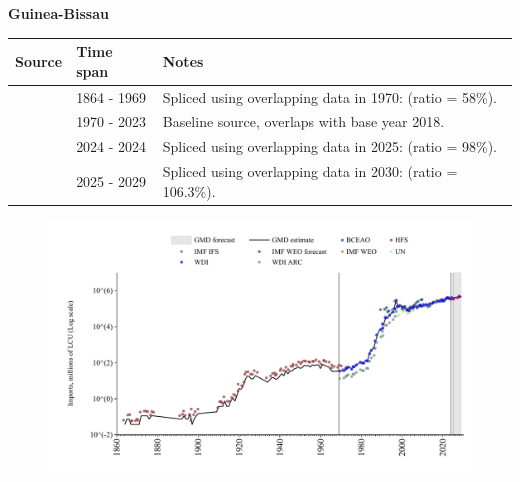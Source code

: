 \documentclass[12pt,a4paper,landscape]{article}
\begin{document}
\begin{adjustbox}{max totalsize={\paperwidth}{\paperheight},center}
\begin{minipage}[t][\textheight][t]{\textwidth}
\vspace*{0.5cm}
{}
\begin{center}
{\Large\bfseries Guinea-Bissau}
\end{center}
\vspace{0.5cm}
\begin{table}[H]
\centering
\small
\begin{tabular}{|l|l|l|}
\hline
\textbf{Source} & \textbf{Time span} & \textbf{Notes} \\
\hline
\rowcolor{white}\cite{HFS}& 1864 - 1969 &Spliced using overlapping data in 1970: (ratio = 58\%).\\
\rowcolor{lightgray}\cite{WDI}& 1970 - 2023 &Baseline source, overlaps with base year 2018.\\
\rowcolor{white}\cite{BCEAO}& 2024 - 2024 &Spliced using overlapping data in 2025: (ratio = 98\%).\\
\rowcolor{lightgray}\cite{IMF_WEO_forecast}& 2025 - 2029 &Spliced using overlapping data in 2030: (ratio = 106.3\%).\\
\hline
\end{tabular}
\end{table}
\begin{figure}[H]
\centering
\includegraphics[width=\textwidth,height=0.6\textheight,keepaspectratio]{graphs/GNB_imports.pdf}
\end{figure}
\end{minipage}
\end{adjustbox}
\end{document}
